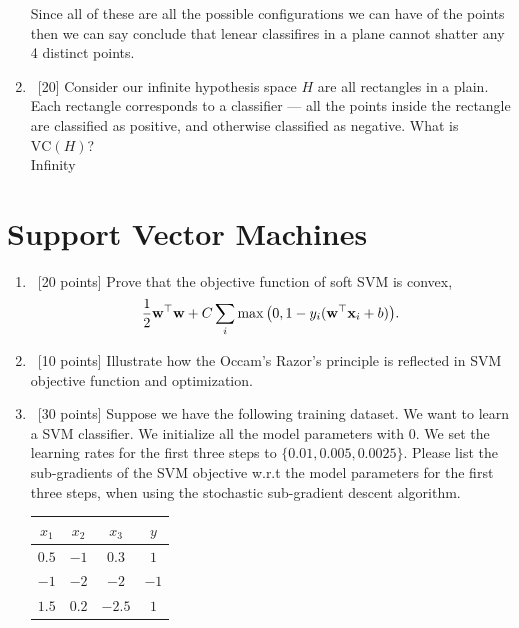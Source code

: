 \documentclass[12pt, fullpage,letterpaper]{article}
\begin{document}
\begin{enumerate}
    Since all of these are all the possible configurations we can have of the points then we can say conclude that
    lenear classifires in a plane cannot shatter any 4 distinct points.



\item~[20] Consider our infinite hypothesis space $H$ are all rectangles in a plain. Each rectangle corresponds to a classifier --- all the points inside the rectangle are classified as positive, and otherwise classified as negative. What is $\mathrm{VC}(H)$?\\
Infinity
\end{enumerate}

\section{Support Vector Machines}
\begin{enumerate}
\item~[20 points] Prove that the objective function of soft SVM is convex,
\[
\frac{1}{2}{\bf w}^\top{\bf w} + C\sum_{i} \max\big(0, 1 - y_i({\bf w}^\top{\bf x}_i+b)\big).
\]

\item~[10 points] Illustrate how the Occam's Razor's principle is reflected in SVM objective function and optimization. 


\item~[30 points] Suppose we have the following training dataset. We want to learn a SVM classifier. We initialize all the model parameters with $0$. We set the learning rates for the first three steps to $\{0.01, 0.005, 0.0025\}$.  Please list the sub-gradients of the SVM objective w.r.t the model parameters for the first three steps, when using the stochastic sub-gradient descent algorithm. 
\begin{table}[h]
        \centering
        \begin{tabular}{ccc|c}
        $x_1$ & $x_2$ & $x_3$ &  $y$\\ 
        \hline\hline
         $0.5$ & $-1$ & $0.3$ & $1$ \\ \hline
         $-1$ & $-2$ & $-2$ & $-1$\\ \hline
         $1.5$ & $0.2$ & $-2.5$ & $1$\\ \hline
        \end{tabular}
\end{table}

\end{enumerate}
\end{document}
